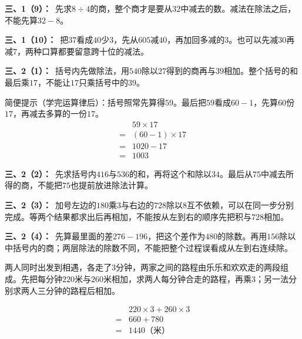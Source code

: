 \documentclass[multi=snippet,border=0pt]{standalone}
\newenvironment{snippet}[3]{\begin{minipage}{#1bp}\color{answerred}\fontsize{#2}{#3}\selectfont\raggedright}{\end{minipage}}
\begin{document}
\begin{snippet}{505}{11.5}{14}\textbf{三、1（9）：}\ 先求\(8\div4\)的商，整个商才是要从\(32\)中减去的数。减法在除法之后，不能先算\(32-8\)。\end{snippet}
\begin{snippet}{505}{11.5}{14}\textbf{三、1（10）：}\ 把\(37\)看成\(40\)少\(3\)，先从\(605\)减\(40\)，再加回多减的\(3\)。也可以先减\(30\)再减\(7\)，两种口算都要留意跨十位的减法。\end{snippet}
\begin{snippet}{505}{11.5}{14}\textbf{三、2（1）：}\ 括号内先做除法，用\(540\)除以\(27\)得到的商再与\(39\)相加。整个括号的和最后乘\(17\)，不能让\(17\)只乘括号中的\(39\)。\par 简便提示（学完运算律后）：括号照常先算得\(59\)。最后把\(59\)看成\(60-1\)，先算\(60\)份\(17\)，再减去多算的一份\(17\)。\[\begin{aligned}&59\times17\\={}&(60-1)\times17\\={}&1020-17\\={}&1003\end{aligned}\]\end{snippet}
\begin{snippet}{505}{11.5}{14}\textbf{三、2（2）：}\ 先求括号内\(416\)与\(536\)的和，再将这个和除以\(34\)。最后从\(75\)中减去所得的商，不能把\(75\)也提前放进除法计算。\end{snippet}
\begin{snippet}{505}{11.5}{14}\textbf{三、2（3）：}\ 加号左边的\(180\)乘\(3\)与右边的\(728\)除以\(8\)互不依赖，可以在同一步分别完成。等两个结果都求出后再相加，不能按从左到右的顺序先把积与\(728\)相加。\end{snippet}
\begin{snippet}{505}{11.5}{14}\textbf{三、2（4）：}\ 先算最里面的差\(276-196\)，把这个差作为\(480\)的除数。再用\(156\)除以中括号内的商；两层除法的除数不同，不能把整个过程误看成从左到右连续除。\end{snippet}
\begin{snippet}{505}{11.5}{14}两人同时出发到相遇，各走了\(3\)分钟，两家之间的路程由乐乐和欢欢走的两段组成。先把每分钟\(220\)米与\(260\)米相加，求两人每分钟合走的路程，再乘\(3\)；另一法分别求两人三分钟的路程后相加。\par \[\begin{aligned}&220\times3+260\times3\\={}&660+780\\={}&1440\text{（米）}\end{aligned}\]\end{snippet}
\end{document}
